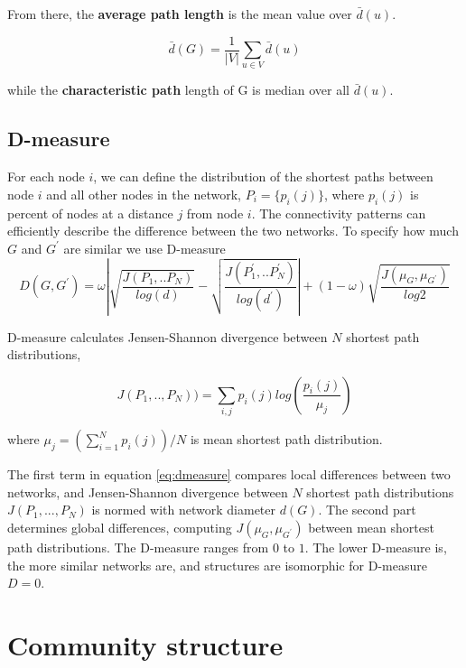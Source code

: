 From there, the \textbf{average path length} is the mean value over $\bar{d}(u)$.

\begin{equation}
\bar{d}(G) = \frac{1}{|V|}\sum_{u \in V} \bar{d}(u)
\end{equation}

while the \textbf{characteristic path} length of G is median over all $\bar{d}(u)$.


\subsection{D-measure}

For each node $i$, we can define the distribution of the shortest paths between node $i$ and all other nodes in the network, $P_{i}=\{p_{i}(j)\}$, where $p_{i}(j)$ is percent of nodes at a distance $j$ from node $i$. The connectivity patterns can efficiently describe the difference between the two networks.    
To specify how much $G$ and $G^{'}$ are similar we use D-measure \cite{tiago2}
\begin{equation}
D(G, G^{'}) = \omega \left| \sqrt{\frac{J(P_1,..P_N)}{log(d)}}-\sqrt{\frac{J(P_1^{'},..P_N^{'})}{log(d^{'})}} \right| + (1-\omega) \sqrt{\frac{J(\mu_{G},\mu_{G^{'}})}{log2}}
\label{eq:dmeasure}
\end{equation}

D-measure calculates Jensen-Shannon divergence between $N$ shortest path distributions,

\begin{equation}
J(P_1,.., P_N)) = \sum_{i,j}p_i(j)log(\frac{p_i(j)}{\mu_j})
\end{equation}

where  $\mu_j = (\sum_{i=1}^N p_i(j))/N$ is mean shortest path distribution.

The first term in equation \ref{eq:dmeasure} compares local differences between two networks, and Jensen-Shannon divergence between $N$ shortest path distributions $J(P_{1},..., P_{N})$ is normed with network diameter $d(G)$. The second part determines global differences, computing  ${J(\mu_{G},\mu_{G^{'}})}$ between mean shortest path distributions. The D-measure ranges from $0$ to $1$. The lower D-measure is, the more similar networks are, and structures are isomorphic for D-measure $D = 0$.

\newpage
\section{Community structure}

